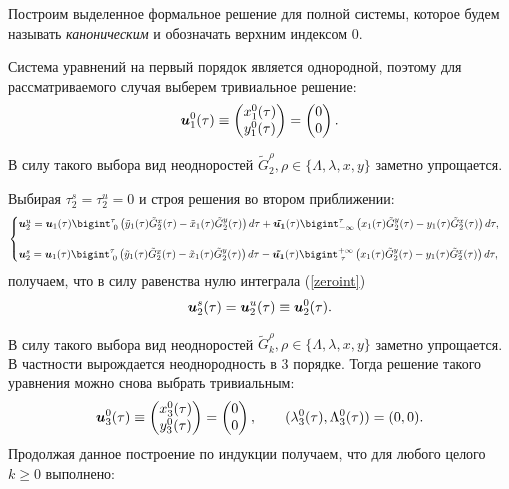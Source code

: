 Построим выделенное формальное решение для полной системы, которое будем называть \textit{каноническим} и обозначать верхним индексом $0$.

Система уравнений на первый порядок является однородной, поэтому для рассматриваемого случая выберем тривиальное решение:
\begin{align*}
    \boldsymbol{u}^0_1(\tau) \equiv \begin{pmatrix} x^0_1(\tau) \\ y^0_1(\tau) \end{pmatrix} = \begin{pmatrix} 0 \\ 0 \end{pmatrix}.
\end{align*}

В силу такого выбора вид неодноростей $\tilde G_2^\rho, \rho \in \{\Lambda,\lambda,x,y\}$ заметно упрощается.

Выбирая $\tau_2^s = \tau_2^u = 0$ и строя решения во втором приближении: 
\begin{equation*}
    \begin{cases}
        \v u_2^u = 
        \v u_1(\tau)\bigint_{\text{ } 0}^\tau \left( \tilde y_1(\tau) \tilde G_2^x(\tau) - \tilde x_1(\tau) \tilde G_2^y(\tau) \right) d \tau + 
        \v{ \tilde{u_1}}(\tau) \bigint_{-\infty}^\tau \left( x_1(\tau) \tilde G_2^y(\tau) - y_1(\tau) \tilde G_2^x(\tau) \right) d \tau,\\
        \\
        
        \v u_2^s = 
        \v u_1(\tau)\bigint_{\text{ } 0}^{\tau} \left( \tilde y_1(\tau) \tilde G_2^x(\tau) - \tilde x_1(\tau) \tilde G_2^y(\tau) \right) d \tau - 
        \v{ \tilde{u_1}}(\tau) \bigint_{\text{ } \tau}^{+\infty} \left( x_1(\tau) \tilde G_2^y(\tau) - y_1(\tau) \tilde G_2^x(\tau) \right) d \tau, \\
    \end{cases}
\end{equation*}
получаем, что в силу равенства нулю интеграла (\ref{zeroint})
$$\boldsymbol{u}_2^s(\tau) = \boldsymbol{u}_2^u(\tau) \equiv \boldsymbol{u}_2^0(\tau).$$

В силу такого выбора вид неодноростей $\tilde G_k^\rho, \rho \in \{\Lambda,\lambda,x,y\}$ заметно упрощается. В частности вырождается неоднородность в 3 порядке. Тогда решение такого уравнения можно снова выбрать тривиальным:
\begin{align*}
    \boldsymbol{u}^0_3(\tau) \equiv \begin{pmatrix} x^0_3(\tau) \\ y^0_3(\tau) \end{pmatrix} = \begin{pmatrix} 0 \\ 0 \end{pmatrix}, \qquad
(\lambda^0_3(\tau), \Lambda^0_3(\tau)) = (0,0).
\end{align*}
Продолжая данное построение по индукции получаем, что для любого целого $k\ge 0$ выполнено:


